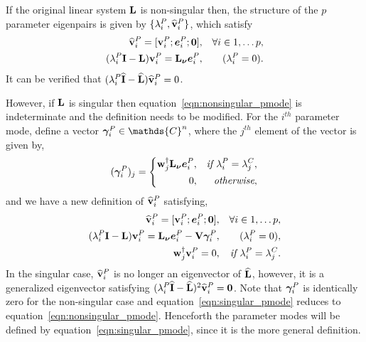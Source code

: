 If the original linear system $\mathbf{L}$ is non-singular then, the structure of the $p$ parameter eigenpairs is given by $\{\lambda^{P}_{i}, \widehat{\mathbf{v}}^{P}_{i}\}$, which satisfy
\begin{subequations}
	\label{eqn:nonsingular_pmode} 
	\begin{align}
		\widehat{\mathbf{v}}^{P}_{i} = [
	  	\mathbf{v}^{P}_{i}; 
	  	\boldsymbol{e}^{P}_{i}; 
	  	\mathbf{0}  ], && \forall i \in 1,\ldots p, \\
	  	(\lambda^{P}_{i}\mathbf{I} - \mathbf{L})\mathbf{v}^{P}_{i} = \mathbf{L}_{\boldsymbol{\nu}}\boldsymbol{e}^{P}_{i}, &&  (\lambda^{P}_{i} = 0). 
	\end{align}
\end{subequations}
It can be verified that $(\lambda^{P}_{i}\mathbf{\widehat{I}} - \mathbf{\widehat{L}})\widehat{\mathbf{v}}^{P}_{i} = 0$.

However, if $\mathbf{L}$ is singular then equation~\eqref{eqn:nonsingular_pmode} is indeterminate and the definition needs to be modified. For the $i^{th}$ parameter mode, define a vector $\vfield{\gamma}^{P}_{i} \in \mathds{C}^{n}$, where the $j^{th}$ element of the vector is given by,
\begin{equation}
	(\boldsymbol{\gamma}^{P}_{i})_{j} =
	\left\lbrace
	\begin{split}
		\mathbf{w}^{\dagger}_{j}\mathbf{L}_{\boldsymbol{\nu}}\boldsymbol{e}^{P}_{i},  && \textit{if } \lambda^{P}_{i} = \lambda^{C}_{j}, \\
		0,						 && \textit{otherwise},	
	\end{split}\right.
\end{equation}
and we have a new definition of $\widehat{\mathbf{v}}^{P}_{i}$ satisfying,
\begin{subequations}
	\label{eqn:singular_pmode}
	\begin{align}
		\widehat{\mathbf{v}}^{P}_{i} = [
		\mathbf{v}^{P}_{i};
		\boldsymbol{e}^{P}_{i};
		\mathbf{0} ], && \forall i \in 1,\ldots p, \\
		(\lambda^{P}_{i}\mathbf{I} - \mathbf{L})\mathbf{v}^{P}_{i} = \mathbf{L}_{\boldsymbol{\nu}}\boldsymbol{e}^{P}_{i} - \mathbf{V}\boldsymbol{\gamma}^{P}_{i}, &&  (\lambda^{P}_{i} = 0), \\
		\mathbf{w}^{\dagger}_{j}\mathbf{v}^{P}_{i} =0, && \textit{if } \lambda^{P}_{i} = \lambda^{C}_{j}. 
	\end{align}
\end{subequations}
In the singular case, $\widehat{\mathbf{v}}^{P}_{i}$ is no longer an eigenvector of $\mathbf{\widehat{L}}$, however, it is a generalized eigenvector satisfying $(\lambda^{P}_{i}\mathbf{\widehat{I}} - \mathbf{\widehat{L}})^{2}\widehat{\mathbf{v}}^{P}_{i} = \mathbf{0}$. Note that $\boldsymbol{\gamma}^{P}_{i}$ is identically zero for the non-singular case and equation~\eqref{eqn:singular_pmode} reduces to equation~\eqref{eqn:nonsingular_pmode}. Henceforth the parameter modes will be defined by equation~\eqref{eqn:singular_pmode}, since it is the more general definition. 

